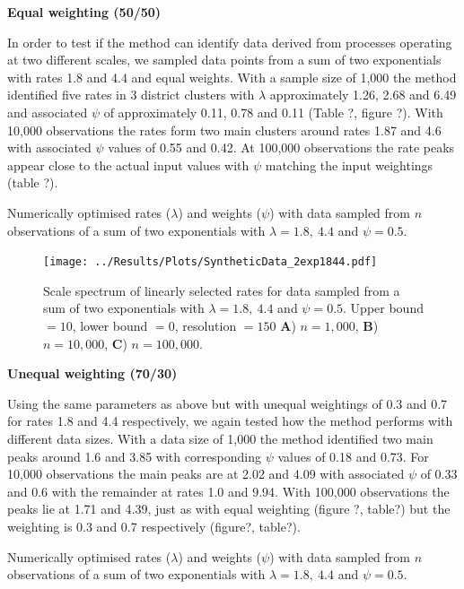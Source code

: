 \documentclass[11pt,usenames,dvipsnames]{article}
\begin{document}
\noindent
\textbf{Equal weighting (50/50)}

In order to test if the method can identify data derived from processes operating at two different scales, we sampled data points from a sum of two exponentials with rates 1.8 and 4.4 and equal weights. With a sample size of 1,000 the method identified five rates in 3 district clusters with $\lambda$ approximately 1.26, 2.68 and 6.49 and associated $\psi$ of approximately 0.11, 0.78 and 0.11 (Table ?, figure ?). With 10,000 observations the rates form two main clusters around rates 1.87 and 4.6 with associated $\psi$ values of 0.55 and 0.42. At 100,000 observations the rate peaks appear close to the actual input values with $\psi$ matching the input weightings (table ?). 

\begin{table}[H]
	\centering
	\caption{Numerically optimised rates ($\lambda$) and weights ($\psi$) with data sampled from $n$ observations of a sum of two exponentials with $\lambda = 1.8,\ 4.4$ and $\psi = 0.5$.}
	
\end{table}


\begin{figure}[H]
	\centering
	\texttt{[image: ../Results/Plots/SyntheticData\_2exp1844.pdf]}
	\caption{Scale spectrum of linearly selected rates for data sampled from a sum of two exponentials with $\lambda = 1.8,\ 4.4$ and $\psi = 0.5$. Upper bound $= 10$, lower bound $= 0$, resolution $= 150$ \textbf{A}) $n = 1,000$, \textbf{B}) $n = 10,000$,  \textbf{C}) $n = 100,000$.}
\end{figure}

\noindent
\textbf{Unequal weighting (70/30)}

Using the same parameters as above but with unequal weightings of 0.3 and 0.7 for rates 1.8 and 4.4 respectively, we again tested how the method performs with different data sizes. With a data size of 1,000 the method identified two main peaks around 1.6 and 3.85 with corresponding $\psi$ values of 0.18 and 0.73. For 10,000 observations the main peaks are at 2.02 and 4.09 with associated $\psi$ of 0.33 and 0.6 with the remainder at rates 1.0 and 9.94. With 100,000 observations the peaks lie at 1.71 and 4.39, just as with equal weighting (figure ?, table?) but the weighting is 0.3 and 0.7 respectively (figure?, table?).

\begin{table}[H]
	\centering
	\caption{Numerically optimised rates ($\lambda$) and weights ($\psi$) with data sampled from $n$ observations of a sum of two exponentials with $\lambda = 1.8,\ 4.4$ and $\psi = 0.5$.}
	
\end{table}
\end{document}
